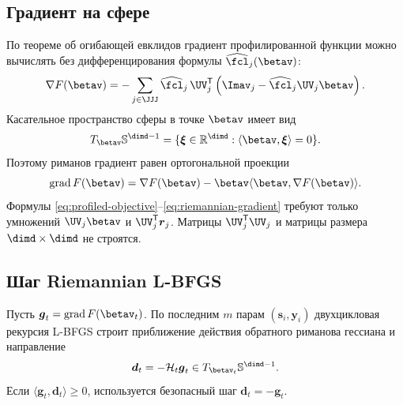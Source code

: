 \subsection{Градиент на сфере}

По теореме об огибающей евклидов градиент профилированной функции можно
вычислять без дифференцирования формулы
$\widehat{\fcl}_j(\betav)$:
\begin{equation}
 \nabla F(\betav)
 =-
 \sum_{j\in\JJJ}
 \widehat{\fcl}_j\,
 \UV_j^{\mathsf T}
 \left(
  \Imav_j-\widehat{\fcl}_j\UV_j\betav
 \right).
\label{eq:euclidean-gradient}
\end{equation}
Касательное пространство сферы в точке $\betav$ имеет вид
\begin{equation}
 T_{\betav}\mathbb S^{\dimd-1}
 =\{\boldsymbol{\xi}\in\mathbb R^{\dimd}:\langle\betav,\boldsymbol{\xi}\rangle=0\}.
\end{equation}
Поэтому риманов градиент равен ортогональной проекции
\begin{equation}
 \operatorname{grad}F(\betav)
 =\nabla F(\betav)
 -\betav\langle\betav,\nabla F(\betav)\rangle.
\label{eq:riemannian-gradient}
\end{equation}
Формулы \eqref{eq:profiled-objective}--\eqref{eq:riemannian-gradient}
требуют только умножений $\UV_j\betav$ и
$\UV_j^{\mathsf T}\boldsymbol{r}_j$. Матрицы $\UV_j^{\mathsf T}\UV_j$ и матрицы
размера $\dimd\times\dimd$ не строятся.

\subsection{Шаг Riemannian L-BFGS}

Пусть $\boldsymbol{g}_t=\operatorname{grad}F(\betav_t)$. По последним $m$ парам
$(\boldsymbol{s}_i,\boldsymbol{y}_i)$ двухцикловая рекурсия L-BFGS строит приближение действия
обратного риманова гессиана и направление
\begin{equation}
 \boldsymbol{d}_t=-\mathcal H_t\boldsymbol{g}_t
 \in T_{\betav_t}\mathbb S^{\dimd-1}.
\end{equation}
Если $\langle\boldsymbol{g}_t,\boldsymbol{d}_t\rangle\ge0$, используется безопасный шаг
$\boldsymbol{d}_t=-\boldsymbol{g}_t$.

